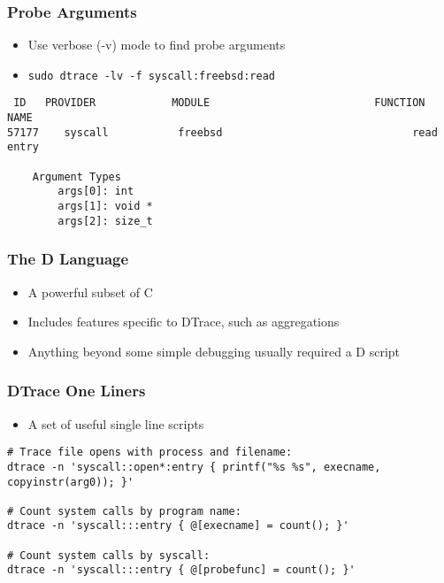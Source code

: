 \documentclass[pdftex]{beamer}
\begin{document}
\begin{frame}[fragile]
  \frametitle{Probe Arguments}
  \begin{itemize}
  \item Use verbose (-v) mode to find probe arguments
  \item \Verb+sudo dtrace -lv -f syscall:freebsd:read+
  \end{itemize}
\begin{verbatim}
 ID   PROVIDER            MODULE                          FUNCTION NAME
57177    syscall           freebsd                              read entry

	Argument Types
		args[0]: int
		args[1]: void *
		args[2]: size_t
\end{verbatim}
\end{frame}

\begin{frame}
  \frametitle{The D Language}
  \begin{itemize}
  \item A powerful subset of C
  \item Includes features specific to DTrace, such as aggregations
  \item Anything beyond some simple debugging usually required a D
    script
  \end{itemize}
\end{frame}

\begin{frame}[fragile]
  \frametitle{DTrace One Liners}
  \begin{itemize}
  \item A set of useful single line scripts
  \end{itemize}
\begin{lstlisting}
# Trace file opens with process and filename:
dtrace -n 'syscall::open*:entry { printf("%s %s", execname, copyinstr(arg0)); }'

# Count system calls by program name:
dtrace -n 'syscall:::entry { @[execname] = count(); }'

# Count system calls by syscall:
dtrace -n 'syscall:::entry { @[probefunc] = count(); }'
\end{lstlisting}
\end{frame}
\end{document}
